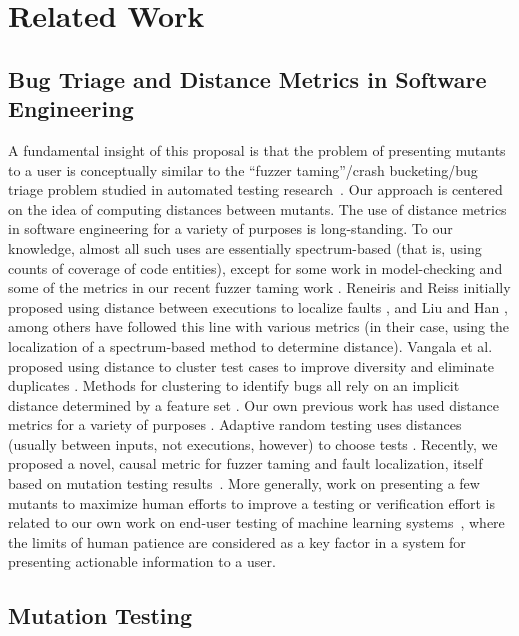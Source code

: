 \section{Related Work}

\subsection{Bug Triage and Distance Metrics in Software Engineering}

A fundamental insight of this proposal is that the problem of
presenting mutants to a user is conceptually similar to the ``fuzzer
taming''/crash bucketing/bug triage problem studied in automated
testing research~\cite{PLDI13,SemCrash}.  Our approach is centered on
the idea of computing distances between mutants.  The use of distance metrics in software engineering for a variety of
purposes is long-standing.  To our knowledge, almost all such uses are
essentially spectrum-based \cite{RepsSpectra} (that is, using counts
of coverage of code entities), except for some work in model-checking
\cite{GroceDist,ChakiLev} and some of the metrics in our recent fuzzer
taming work \cite{PLDI13}.  Reneiris and Reiss initially proposed
using distance between executions to localize faults
\cite{NearNeighbor}, and Liu and Han \cite{Liu06}, among others have
followed this line with various metrics (in their case, using the
localization of a spectrum-based method to determine distance).
Vangala et al. proposed using distance to cluster test cases to
improve diversity and eliminate duplicates \cite{VangalaDist}. Methods
for clustering to identify bugs all rely on an implicit distance
determined by a feature set \cite{Podgurski04}.  Our own previous work
has used distance metrics for a variety of purposes
\cite{PLDI13,icst2014,issta14}.  Adaptive random testing uses
distances (usually between inputs, not executions, however) to choose
tests \cite{Chen,ARTChen,ISSTAART}.  Recently, we proposed a novel,
causal metric for fuzzer taming and fault localization, itself based on
mutation testing results~\cite{distMut}.  More generally, work on
presenting a few mutants to maximize human efforts to improve a
testing or verification effort
is related to our own work on end-user testing of machine learning
systems~\cite{EndUserMistake,OnlyOracle}, where the limits of human
patience are considered as a key factor in a system for presenting
actionable information to a user.


\subsection{Mutation Testing}

